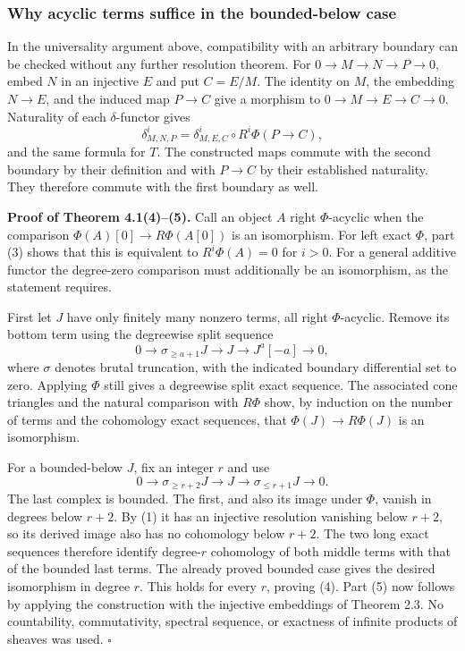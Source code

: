 \documentclass[
  english,
  11pt,
  a4paper,
]{article}
\begin{document}
\subsubsection{Why acyclic terms suffice in the bounded-below
case}\label{injective-modules-and-bounded-below-derived-functors--why-acyclic-terms-suffice-in-the-bounded-below-case}

In the universality argument above, compatibility with an arbitrary
boundary can be checked without any further resolution theorem. For
\(0\to M\to N\to P\to0\), embed \(N\) in an injective \(E\) and put
\(C=E/M\). The identity on \(M\), the embedding \(N\to E\), and the
induced map \(P\to C\) give a morphism to \(0\to M\to E\to C\to0\).
Naturality of each \(\delta\)-functor gives
\[\delta_{M,N,P}^i=\delta_{M,E,C}^i\circ R^i\Phi(P\to C),\] and the same
formula for \(T\). The constructed maps commute with the second boundary
by their definition and with \(P\to C\) by their established naturality.
They therefore commute with the first boundary as well.

\textbf{Proof of Theorem 4.1(4)--(5).} Call an object \(A\) right
\(\Phi\)-acyclic when the comparison \(\Phi(A)[0]\to R\Phi(A[0])\) is an
isomorphism. For left exact \(\Phi\), part (3) shows that this is
equivalent to \(R^i\Phi(A)=0\) for \(i>0\). For a general additive
functor the degree-zero comparison must additionally be an isomorphism,
as the statement requires.

First let \(J\) have only finitely many nonzero terms, all right
\(\Phi\)-acyclic. Remove its bottom term using the degreewise split
sequence \[0\longrightarrow \sigma_{\ge a+1}J\longrightarrow J
\longrightarrow J^a[-a]\longrightarrow0,\] where \(\sigma\) denotes
brutal truncation, with the indicated boundary differential set to zero.
Applying \(\Phi\) still gives a degreewise split exact sequence. The
associated cone triangles and the natural comparison with \(R\Phi\)
show, by induction on the number of terms and the cohomology exact
sequences, that \(\Phi(J)\to R\Phi(J)\) is an isomorphism.

For a bounded-below \(J\), fix an integer \(r\) and use
\[0\longrightarrow \sigma_{\ge r+2}J\longrightarrow J
\longrightarrow \sigma_{\le r+1}J\longrightarrow0.\] The last complex is
bounded. The first, and also its image under \(\Phi\), vanish in degrees
below \(r+2\). By (1) it has an injective resolution vanishing below
\(r+2\), so its derived image also has no cohomology below \(r+2\). The
two long exact sequences therefore identify degree-\(r\) cohomology of
both middle terms with that of the bounded last terms. The already
proved bounded case gives the desired isomorphism in degree \(r\). This
holds for every \(r\), proving (4). Part (5) now follows by applying the
construction with the injective embeddings of Theorem 2.3. No
countability, commutativity, spectral sequence, or exactness of infinite
products of sheaves was used. \(\square\)
\end{document}
